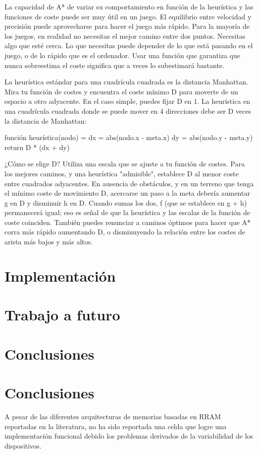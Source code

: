 \documentclass[reprint,amsmath,amssymb,aps]{revtex4-2}
\begin{document}
La capacidad de A* de variar su comportamiento en función de la heurística y las funciones de coste puede ser muy útil en un juego. El equilibrio entre velocidad y precisión puede aprovecharse para hacer el juego más rápido. Para la mayoría de los juegos, en realidad no necesitas el mejor camino entre dos puntos. Necesitas algo que esté cerca. Lo que necesitas puede depender de lo que está pasando en el juego, o de lo rápido que es el ordenador. Usar una función que garantiza que nunca sobreestima el coste significa que a veces lo subestimará bastante.

La heurística estándar para una cuadrícula cuadrada es la distancia Manhattan. Mira tu función de costes y encuentra el coste mínimo D para moverte de un espacio a otro adyacente. En el caso simple, puedes fijar D en 1. La heurística en una cuadrícula cuadrada donde se puede mover en 4 direcciones debe ser D veces la distancia de Manhattan:

función heurística(nodo) =
    dx = abs(nodo.x - meta.x)
    dy = abs(nodo.y - meta.y)
    return D * (dx + dy)

¿Cómo se elige D? Utiliza una escala que se ajuste a tu función de costes. Para los mejores caminos, y una heurística "admisible", establece D al menor coste entre cuadrados adyacentes. En ausencia de obstáculos, y en un terreno que tenga el mínimo coste de movimiento D, acercarse un paso a la meta debería aumentar g en D y disminuir h en D. Cuando sumas los dos, f (que se establece en g + h) permanecerá igual; eso es señal de que la heurística y las escalas de la función de coste coinciden. También puedes renunciar a caminos óptimos para hacer que A* corra más rápido aumentando D, o disminuyendo la relación entre los costes de arista más bajos y más altos.

\section{Implementación}

\section{Trabajo a futuro}

\section{Conclusiones}




\section{Conclusiones}
A pesar de las diferentes arquitecturas de memorias basadas en RRAM reportadas en la literatura, no ha sido reportada una celda que logre una implementación funcional debido los problemas derivados de la variabilidad de los dispositivos.
  

\nocite{*}
\end{document}
